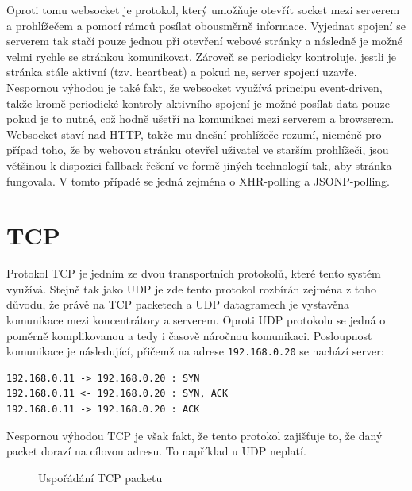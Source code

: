 Oproti tomu websocket \cite{rfc6455} je protokol, který umožňuje otevřít socket mezi serverem a prohlížečem a pomocí rámců posílat obousměrně informace. Vyjednat spojení se serverem tak stačí pouze jednou při otevření webové stránky a následně je možné velmi rychle se stránkou komunikovat. Zároveň se periodicky kontroluje, jestli je stránka stále aktivní (tzv. heartbeat) a pokud ne, server spojení uzavře. Nespornou výhodou je také fakt, že websocket využívá principu event-driven, takže kromě periodické kontroly aktivního spojení je možné posílat data pouze pokud je to nutné, což hodně ušetří na komunikaci mezi serverem a browserem. Websocket staví nad HTTP, takže mu dnešní prohlížeče rozumí, nicméně pro případ toho, že by webovou stránku otevřel uživatel ve starším prohlížeči, jsou většinou k dispozici fallback řešení ve formě jiných technologií tak, aby stránka fungovala. V tomto případě se jedná zejména o XHR-polling a JSONP-polling.

\section{TCP}
Protokol TCP je jedním ze dvou transportních protokolů, které tento systém využívá. Stejně tak jako UDP je zde tento protokol rozbírán zejména z toho důvodu, že právě na TCP packetech a UDP datagramech je vystavěna komunikace mezi koncentrátory a serverem. Oproti UDP protokolu se jedná o poměrně komplikovanou a tedy i časově náročnou komunikaci. Posloupnost komunikace je následující, přičemž na adrese \texttt{192.168.0.20} se  nachází server:

\begin{verbatim}
192.168.0.11 -> 192.168.0.20 : SYN
192.168.0.11 <- 192.168.0.20 : SYN, ACK
192.168.0.11 -> 192.168.0.20 : ACK
\end{verbatim}

Nespornou výhodou TCP je však fakt, že tento protokol zajišťuje to, že daný packet dorazí na cílovou adresu. To například u UDP neplatí.

\begin{figure}[h]
    \centering
	\caption{Uspořádání TCP packetu}
	\label{fig:tcp-packet}
\end{figure}

